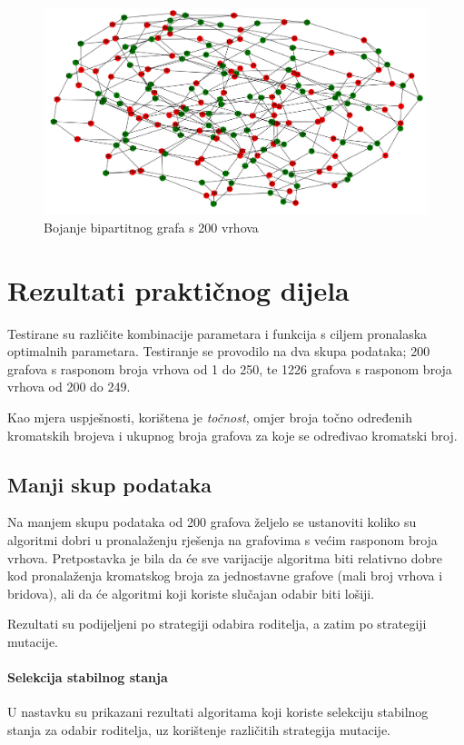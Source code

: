 \documentclass[times, utf8, zavrsni, numeric]{fer}
\begin{document}
\begin{figure}[htb]
\centering
\includegraphics[width=15cm]{images/200_vrhova_bipartitan_graf.png}
\caption{Bojanje bipartitnog grafa s 200 vrhova}
\label{fig:bojanje grafa s 200 vrhova}
\end{figure}

\chapter{Rezultati praktičnog dijela}
Testirane su različite kombinacije parametara i funkcija s ciljem pronalaska optimalnih parametara. Testiranje se provodilo na dva skupa podataka; 200 grafova s rasponom broja vrhova od 1 do 250, te 1226 grafova s rasponom broja vrhova od 200 do 249.

Kao mjera uspješnosti, korištena je \textit{točnost}, omjer broja točno određenih kromatskih brojeva i ukupnog broja grafova za koje se određivao kromatski broj.


\section{Manji skup podataka}
Na manjem skupu podataka od 200 grafova željelo se ustanoviti koliko su algoritmi dobri u pronalaženju rješenja na grafovima s većim rasponom broja vrhova. Pretpostavka je bila da će sve varijacije algoritma biti relativno dobre kod pronalaženja kromatskog broja za jednostavne grafove (mali broj vrhova i bridova), ali da će algoritmi koji koriste slučajan odabir biti lošiji.

Rezultati su podijeljeni po strategiji odabira roditelja, a zatim po strategiji mutacije.

\newpage
\subsubsection{Selekcija stabilnog stanja}
U nastavku su prikazani rezultati algoritama koji koriste selekciju stabilnog stanja za odabir roditelja, uz korištenje različitih strategija mutacije.
\end{document}
